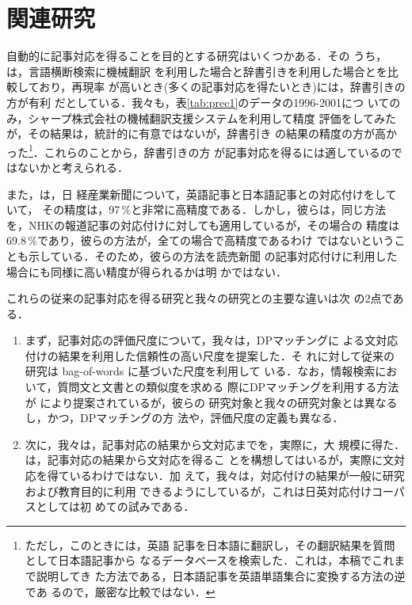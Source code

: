 \section{関連研究}
\label{sec:relwork}

自動的に記事対応を得ることを目的とする研究はいくつかある．その
うち，\cite{collier98:_machin_trans}は，言語横断検索に機械翻訳
を利用した場合と辞書引きを利用した場合とを比較しており，再現率
が高いとき(多くの記事対応を得たいとき)には，辞書引きの方が有利
だとしている．我々も，表\ref{tab:prec1}のデータの1996-2001につ
いてのみ，シャープ株式会社の機械翻訳支援システムを利用して精度
評価をしてみたが，その結果は，統計的に有意ではないが，辞書引き
の結果の精度の方が高かった\footnote {ただし，このときには，英語
  記事を日本語に翻訳し，その翻訳結果を質問として日本語記事から
  なるデータベースを検索した．これは，本稿でこれまで説明してき
  た方法である，日本語記事を英語単語集合に変換する方法の逆であ
  るので，厳密な比較ではない．}．これらのことから，辞書引きの方
が記事対応を得るには適しているのではないかと考えられる．

また，\cite{matsumoto02:_autom_align_japan_englis_newsp}は，日
経産業新聞について，英語記事と日本語記事との対応付けをしていて，
その精度は，97\,\%と非常に高精度である．しかし，彼らは，同じ方法
を，NHKの報道記事の対応付けに対しても適用しているが，その場合の
精度は69.8\,\%であり，彼らの方法が，全ての場合で高精度であるわけ
ではないということも示している．そのため，彼らの方法を読売新聞
の記事対応付けに利用した場合にも同様に高い精度が得られるかは明
かではない．

これらの従来の記事対応を得る研究と我々の研究との主要な違いは次
の2点である．
\begin{enumerate}
\item まず，記事対応の評価尺度について，我々は，DPマッチングに
  よる文対応付けの結果を利用した信頼性の高い尺度を提案した．そ
  れに対して従来の研究は  bag-of-words に基づいた尺度を利用して
  いる．なお，情報検索において，質問文と文書との類似度を求める
  際にDPマッチングを利用する方法が
  \cite{yamamoto00:_dynam_progr}により提案されているが，彼らの
  研究対象と我々の研究対象とは異なるし，かつ，DPマッチングの方
  法や，評価尺度の定義も異なる．
\item 次に，我々は，記事対応の結果から文対応までを，実際に，大
  規模に得た．\cite{大和99}は，記事対応の結果から文対応を得るこ
  とを構想してはいるが，実際に文対応を得ているわけではない．加
  えて，我々は，対応付けの結果が一般に研究および教育目的に利用
  できるようにしているが，これは日英対応付けコーパスとしては初
  めての試みである．
\end{enumerate}

